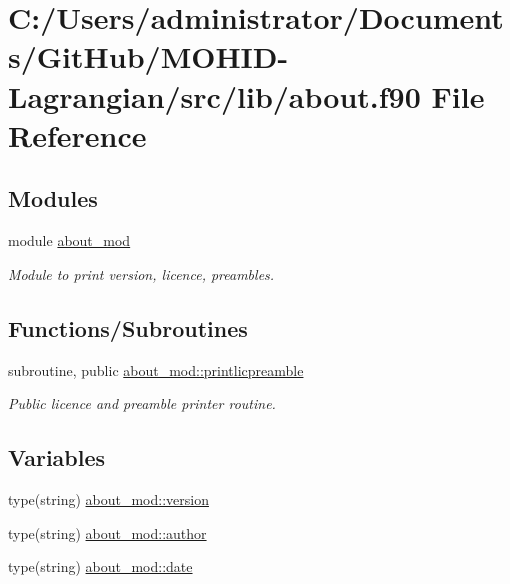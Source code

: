 \hypertarget{about_8f90}{}\section{C\+:/\+Users/administrator/\+Documents/\+Git\+Hub/\+M\+O\+H\+I\+D-\/\+Lagrangian/src/lib/about.f90 File Reference}
\label{about_8f90}
\subsection*{Modules}
\begin{DoxyCompactItemize}
\item 
module \mbox{\hyperlink{namespaceabout__mod}{about\+\_\+mod}}
\begin{DoxyCompactList}\small\item\em Module to print version, licence, preambles. \end{DoxyCompactList}\end{DoxyCompactItemize}
\subsection*{Functions/\+Subroutines}
\begin{DoxyCompactItemize}
\item 
subroutine, public \mbox{\hyperlink{namespaceabout__mod_a9fb866e1576b843b42649d84b80f4b52}{about\+\_\+mod\+::printlicpreamble}}
\begin{DoxyCompactList}\small\item\em Public licence and preamble printer routine. \end{DoxyCompactList}\end{DoxyCompactItemize}
\subsection*{Variables}
\begin{DoxyCompactItemize}
\item 
type(string) \mbox{\hyperlink{namespaceabout__mod_af0051041c5a98e3eb7284580236db3a0}{about\+\_\+mod\+::version}}
\item 
type(string) \mbox{\hyperlink{namespaceabout__mod_a7c3a72ae7ba5fc7d8a4bf133605f58c3}{about\+\_\+mod\+::author}}
\item 
type(string) \mbox{\hyperlink{namespaceabout__mod_aaac12f65380fb0f10916b3744d9e5a0b}{about\+\_\+mod\+::date}}
\end{DoxyCompactItemize}
